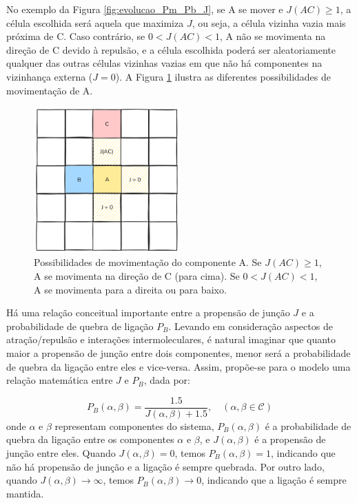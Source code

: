 \documentclass[12pt,oneside]{report}
\begin{document}
No exemplo da Figura \ref{fig:evolucao_Pm_Pb_J}, se A se mover e $J(AC) \geq 1$, a célula escolhida será aquela que maximiza $J$, ou seja, a célula vizinha vazia mais próxima de C. Caso contrário, se $0 < J(AC) < 1$, A não se movimenta na direção de C devido à repulsão, e a célula escolhida poderá ser aleatoriamente qualquer das outras células vizinhas vazias em que não há componentes na vizinhança externa ($J = 0$). A Figura \ref{fig:evolucao_A} ilustra as diferentes possibilidades de movimentação de A.

\begin{figure}[H]
    \centering
    \includegraphics[width=0.5\textwidth]{evolucao_A.png}
    \caption{\small Possibilidades de movimentação do componente A. Se $J(AC) \geq 1$, A se movimenta na direção de C (para cima). Se $0 < J(AC) < 1$, A se movimenta para a direita ou para baixo.}
    \label{fig:evolucao_A}
\end{figure}

Há uma relação conceitual importante entre a propensão de junção $J$ e a probabilidade de quebra de ligação $P_B$. Levando em consideração aspectos de atração/repulsão e interações intermoleculares, é natural imaginar que quanto maior a propensão de junção entre dois componentes, menor será a probabilidade de quebra da ligação entre eles e vice-versa. Assim, propõe-se para o modelo uma relação matemática entre $J$ e $P_B$, dada por:

\begin{equation}
    \label{eq:J_PB}
    P_B(\alpha, \beta) = \frac{1.5}{J(\alpha, \beta) + 1.5}, \quad (\alpha, \beta \in \mathcal{C})
\end{equation}
onde $\alpha$ e $\beta$ representam componentes do sistema, $P_B(\alpha, \beta)$ é a probabilidade de quebra da ligação entre os componentes $\alpha$ e $\beta$, e $J(\alpha, \beta)$ é a propensão de junção entre eles. Quando $J(\alpha, \beta) = 0$, temos $P_B(\alpha, \beta) = 1$, indicando que não há propensão de junção e a ligação é sempre quebrada. Por outro lado, quando $J(\alpha, \beta) \to \infty$, temos $P_B(\alpha, \beta) \to 0$, indicando que a ligação é sempre mantida.
\end{document}
